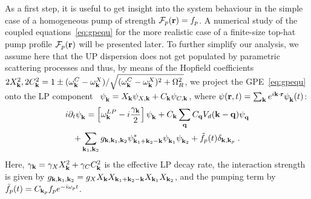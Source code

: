 As a first step, it is useful to get insight into the system behaviour
in the simple case of a homogeneous pump of strength
$\mathcal{F}_p(\mathbf{r}) = f_p$. A numerical study of the coupled
equations~\eqref{eq:gpequ} for the more realistic case of a
finite-size top-hat pump profile $\mathcal{F}_p(\mathbf{r})$ will be
presented later.
%
To further simplify our analysis, we assume here that the UP
dispersion does not get populated by parametric scattering processes
and thus, by means of the Hopfield coefficients $2X_{\mathbf{k}}^2,
2C_{\mathbf{k}}^2 = 1 \pm (\omega_{\mathbf{k}}^{C} -
\omega_{\mathbf{k}}^{X})/\sqrt{(\omega_{\mathbf{k}}^{C} -
  \omega_{\mathbf{k}}^{X})^2 + \Omega_R^2}$, we project the
GPE~\eqref{eq:gpequ} onto the LP
component~\cite{Ciuti_2001,Wouters_2007_b} $\psi_{\mathbf{k}}^{} =
X_{\mathbf{k}} \psi_{X,\mathbf{k}} + C_{\mathbf{k}} \psi_{C,\mathbf{k}}$,
where $\psi(\mathbf{r},t) = \sum_{\mathbf{k}} e^{i\mathbf{k}\cdot \mathbf{r}}
\psi_{\mathbf{k}}^{} (t)$:
%
\begin{multline}
  i\partial_t \psi_{\mathbf{k}}^{} = \left[\omega_{\mathbf{k}}^{LP} -
    i\frac{\gamma_{\mathbf{k}}}{2}\right]\psi_{\mathbf{k}}^{} +
  C_{\mathbf{k}} \sum_{\mathbf{q}} C_{\mathbf{q}} V_d(\mathbf{k} - \mathbf{q})
  \psi_{\mathbf{q}}^{}\\ + \sum_{\mathbf{k}_1, \mathbf{k}_2} g_{\mathbf{k},
    \mathbf{k}_1, \mathbf{k}_2} \psi^*_{\mathbf{k}_1 + \mathbf{k}_2-\mathbf{k}}
  \psi_{\mathbf{k}_1}^{} \psi_{\mathbf{k}_2}^{} + \tilde{f}_p(t)
  \delta_{\mathbf{k},\mathbf{k}_p}\; .
\label{eq:efflp}
\end{multline}
%
Here, $\gamma_{\mathbf{k}}=\gamma_X X_{\mathbf{k}}^2 + \gamma_C
C_{\mathbf{k}}^2$ is the effective LP decay rate, the interaction
strength is given by $g_{\mathbf{k}, \mathbf{k}_1, \mathbf{k}_2}=g_X
X_{\mathbf{k}} X_{\mathbf{k}_1 + \mathbf{k}_2-\mathbf{k}} X_{\mathbf{k}_1}
X_{\mathbf{k}_2}$, and the pumping term by $\tilde{f}_p(t)=
C_{\mathbf{k}_p} f_p e^{-i\omega_p t}$.


